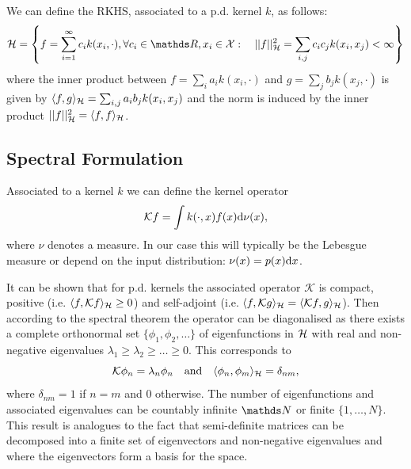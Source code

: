 We can define the RKHS, associated to a p.d. kernel $k$, as follows:
\begin{equation}
  \rkhs = \left\{f = \sum_{i=1}^\infty c_i k(x_i, \cdot), \forall c_i \in \Reals, x_i \in \mathcal{X}:\quad \norm{f}_{\rkhs}^2 = \sum_{i,j} c_i c_j k(x_i, x_j) < \infty \right\}
\end{equation}
where the inner product between $f = \sum_i a_i k(x_i, \cdot)$ and $g = \sum_j b_j k(x_j, \cdot)$ is given by $\langle f,g \rangle_{{\mathcal{H}}} = \sum_{i,j} a_i b_j k(x_i, x_j)$ and the norm is induced by the inner product $\lvert\lvert f\rvert\rvert^2_{{\mathcal{H}}} = \langle f, f \rangle_{{\mathcal{H}}}$.


\subsection{Spectral Formulation}

\begin{definition}
Associated to a kernel $k$ we can define the kernel operator
\begin{equation}
  \mathcal{K} f = \int k(\cdot, x) f(x) \mathrm{d}{\nu(x)},
\end{equation}
where $\nu$ denotes a measure. In our case this will typically be the Lebesgue measure or depend on the input distribution: $\nu(x) = p(x)\mathrm{d}{x}$.
\end{definition}

It can be shown that for p.d. kernels the associated operator $\mathcal{K}$ is compact, positive (i.e. $\langle f, \mathcal{K} f\rangle_{{\mathcal{H}}} \ge 0$) and self-adjoint (i.e. $\langle f, \mathcal{K} g\rangle_{{\mathcal{H}}} = \langle \mathcal{K} f, g\rangle_{{\mathcal{H}}}$). Then according to the spectral theorem \citep[e.g.,][Chapter 17]{lang1993} the operator can be diagonalised as there exists a complete orthonormal set $\{\phi_1, \phi_2, \ldots \}$ of eigenfunctions in ${\mathcal{H}}$ with real and non-negative eigenvalues $\lambda_1 \ge \lambda_2 \ge \ldots \ge 0$. This corresponds to
\begin{equation}
  \mathcal{K} \phi_n = \lambda_n \phi_n\quad\text{and}\quad \langle \phi_n, \phi_m \rangle_{{\mathcal{H}}} = \delta_{nm},
\end{equation}
where $\delta_{nm} = 1$ if $n=m$ and $0$ otherwise. The number of eigenfunctions and associated eigenvalues can be countably infinite $\Naturals$ or finite $\{1, \ldots, N\}$. This result is analogues to the fact that semi-definite matrices can be decomposed into a finite set of eigenvectors and non-negative eigenvalues and where the eigenvectors form a basis for the space.

